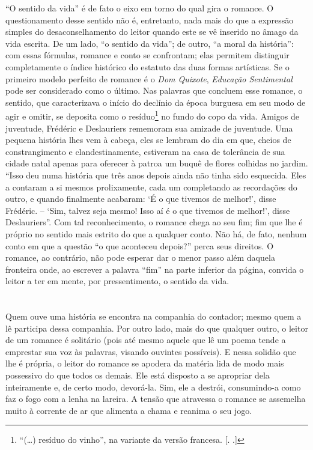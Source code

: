 ``O sentido da vida'' é de fato o eixo em torno do qual gira o romance.
O questionamento desse sentido não é, entretanto, nada mais do que a
expressão simples do desaconselhamento do leitor quando este se vê
inserido no âmago da vida escrita. De um lado, ``o sentido da vida'';
de outro, ``a moral da história'': com essas fórmulas, romance e conto
se confrontam; elas permitem distinguir completamente o índice histórico
do estatuto das duas formas artísticas. Se o primeiro modelo perfeito de
romance é o \emph{Dom Quixote}, \emph{Educação Sentimental} pode ser
considerado como o último. Nas palavras que concluem esse romance, o
sentido, que caracterizava o início do declínio da época burguesa em seu
modo de agir e omitir, se deposita como o resíduo\footnote{``(\ldots{}) resíduo do
  vinho'', na variante da versão francesa. [. .]} no fundo do
copo da vida. Amigos de juventude, Frédéric e Deslauriers rememoram sua
amizade de juventude. Uma pequena história lhes vem à cabeça, eles se
lembram do dia em que, cheios de constrangimento e clandestinamente,
estiveram na casa de tolerância de sua cidade natal apenas para oferecer
à patroa um buquê de flores colhidas no jardim. ``Isso deu numa história
que três anos depois ainda não tinha sido esquecida. Eles a contaram a
si mesmos prolixamente, cada um completando as recordações do outro, e
quando finalmente acabaram: `É o que tivemos de melhor!', disse
Frédéric. -- `Sim, talvez seja mesmo! Isso aí é o que tivemos de
melhor!', disse Deslauriers''. Com tal reconhecimento, o romance chega
ao seu fim; fim que lhe é próprio no sentido mais estrito do que a
qualquer conto. Não há, de fato, nenhum conto em que a questão ``o que
aconteceu depois?'' perca seus direitos. O romance, ao contrário, não
pode esperar dar o menor passo além daquela fronteira onde, ao escrever
a palavra ``fim'' na parte inferior da página, convida o leitor a ter em
mente, por pressentimento, o sentido da vida.

\section{}

Quem ouve uma história se encontra na companhia do contador; mesmo quem
a lê participa dessa companhia. Por outro lado, mais do que qualquer
outro, o leitor de um romance é solitário (pois até mesmo aquele que lê
um poema tende a emprestar sua voz às palavras, visando ouvintes
possíveis). E nessa solidão que lhe é própria, o leitor do romance se
apodera da matéria lida de modo mais possessivo do que todos os demais.
Ele está disposto a se apropriar dela inteiramente e, de certo modo,
devorá-la. Sim, ele a destrói, consumindo-a como faz o fogo com a lenha
na lareira. A tensão que atravessa o romance se assemelha muito à
corrente de ar que alimenta a chama e reanima o seu jogo.

